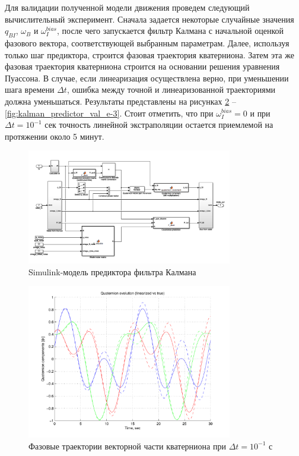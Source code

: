 \documentclass{article}
\begin{document}
Для валидации полученной модели движения проведем следующий вычислительный
эксперимент. Сначала задается некоторые случайные значения $q_{BI}$, $\omega_B$ и
$\omega_I^{bias}$, после чего запускается фильтр Калмана с начальной оценкой
фазового вектора, соответствующей выбранным параметрам. Далее, используя
только шаг предиктора, строится фазовая траектория кватерниона. Затем эта же
фазовая траектория кватерниона строится на основании решения уравнения
Пуассона. В случае, если линеаризация осуществлена верно, при уменьшении шага
времени $\Delta t$, ошибка между точной и линеаризованной траекториями должна
уменьшаться. Результаты представлены на рисунках
\ref{fig:kalman_predictor_val_e-1} -- \ref{fig:kalman_predictor_val_e-3}.
Стоит отметить, что при $\omega_I^{bias} = 0$ и при $\Delta t = 10^{-1}$ сек
точность линейной экстраполяции остается приемлемой на протяжении около 5
минут.
\begin{figure}
\centering
\includegraphics[width=0.8\textwidth]{pic/kalman_predictor.png}
\caption{\label{fig:kalman_predictor}Simulink-модель предиктора фильтра
Калмана}
\end{figure}
\begin{figure}
\centering
\includegraphics[width=0.8\textwidth]{pic/extrapolation_01.pdf}
\caption{\label{fig:kalman_predictor_val_e-1}Фазовые траектории векторной
    части кватерниона при
$\Delta t = 10^{-1}$ с}
\end{figure}
\end{document}
